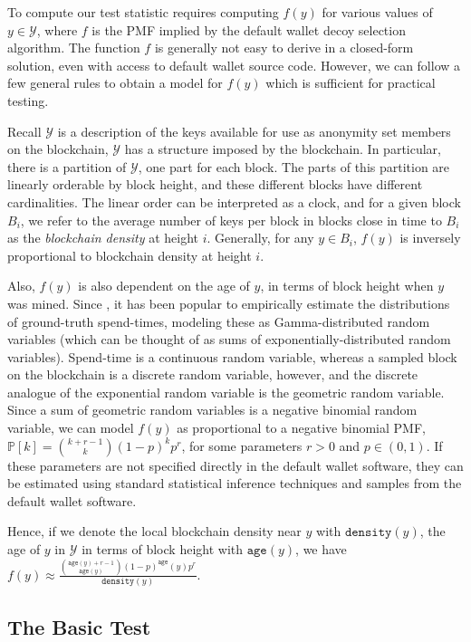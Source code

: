 \documentclass{tran-l}
\theoremstyle{cor}
\theoremstyle{definition}
\theoremstyle{remark}
\theoremstyle{conjecture}
\numberwithin{equation}{section}
\begin{document}
To compute our test statistic requires computing $f(y)$ for various values of $y \in \mathcal{Y}$, where $f$ is the PMF implied by the default wallet decoy selection algorithm.
The function $f$ is generally not easy to derive in a closed-form solution, even with access to default wallet source code.
However, we can follow a few general rules to obtain a model for $f(y)$ which is sufficient for practical testing.

Recall $\mathcal{Y}$ is a description of the keys available for use as anonymity set members on the blockchain, $\mathcal{Y}$ has a structure imposed by the blockchain.
In particular, there is a partition of $\mathcal{Y}$, one part for each block.
The parts of this partition are linearly orderable by block height, and these different blocks have different cardinalities.
The linear order can be interpreted as a clock, and for a given block $B_i$, we refer to the average number of keys per block in blocks close in time to $B_i$ as the \textit{blockchain density} at height $i$.
Generally, for any $y \in B_i$, $f(y)$ is inversely proportional to blockchain density at height $i$.

Also, $f(y)$ is also dependent on the age of $y$, in terms of block height when $y$ was mined.
Since \cite{moser2017empirical}, it has been popular to empirically estimate the distributions of ground-truth spend-times, modeling these as Gamma-distributed random variables (which can be thought of as sums of exponentially-distributed random variables).
Spend-time is a continuous random variable, whereas a sampled block on the blockchain is a discrete random variable, however, and the discrete analogue of the exponential random variable is the geometric random variable.
Since a sum of geometric random variables is a negative binomial random variable, we can model $f(y)$ as proportional to a negative binomial PMF, $\mathbb{P}[k] = \binom{k+r-1}{k}(1-p)^kp^r$, for some parameters $r > 0$ and $p \in (0,1)$. If these parameters are not specified directly in the default wallet software, they can be estimated using standard statistical inference techniques and samples from the default wallet software.

Hence, if we denote the local blockchain density near $y$ with $\texttt{density}(y)$, the age of $y$ in $\mathcal{Y}$ in terms of block height with $\texttt{age}(y)$, we have $f(y) \approx \frac{\binom{\texttt{age}(y)+r-1}{\texttt{age}(y)}(1-p)^\texttt{age}(y) p^r}{\texttt{density}(y)}$.


\subsection{The Basic Test}\label{sec:basic_test_corollary}
\end{document}
